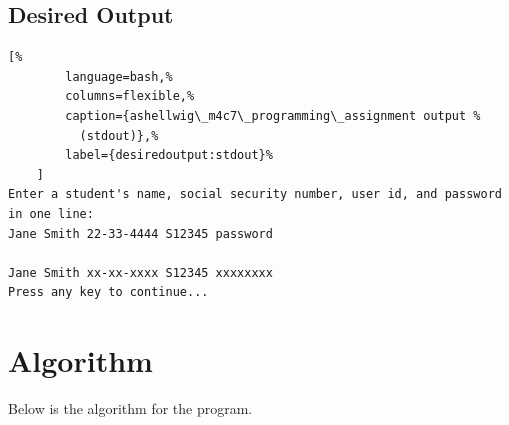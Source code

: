 \documentclass[a4paper, 11pt]{article}
\theoremstyle{definition}
\theoremstyle{plain}
\begin{document}
    \subsection{Desired Output}
      \begin{lstlisting}[%
        language=bash,%
        columns=flexible,%
        caption={ashellwig\_m4c7\_programming\_assignment output %
          (stdout)},%
        label={desiredoutput:stdout}%
    ]
Enter a student's name, social security number, user id, and password
in one line:
Jane Smith 22-33-4444 S12345 password

Jane Smith xx-xx-xxxx S12345 xxxxxxxx
Press any key to continue...
      \end{lstlisting}


  \newpage
  \section{Algorithm}
    Below is the algorithm for the program.
\end{document}
